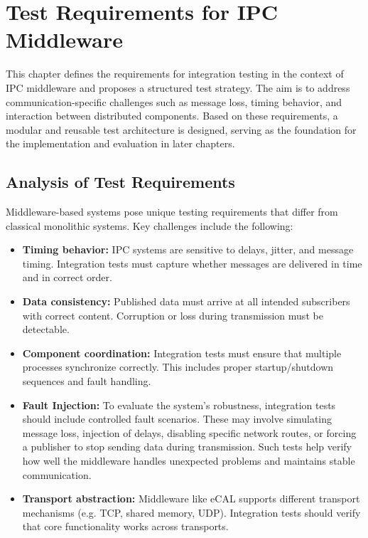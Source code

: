 \clearpage
{}

\section{Test Requirements for IPC Middleware}

This chapter defines the requirements for integration testing in the context of IPC middleware and proposes a structured test strategy. The aim is to address communication-specific challenges such as message loss, timing behavior, and interaction between distributed components. Based on these requirements, a modular and reusable test architecture is designed, serving as the foundation for the implementation and evaluation in later chapters.

\subsection{Analysis of Test Requirements}

Middleware-based systems pose unique testing requirements that differ from classical monolithic systems. Key challenges include the following:

\begin{itemize}
	\item \textbf{Timing behavior:} IPC systems are sensitive to delays, jitter, and message timing. Integration tests must capture whether messages are delivered in time and in correct order.
	
	\item \textbf{Data consistency:} Published data must arrive at all intended subscribers with correct content. Corruption or loss during transmission must be detectable.
	
	\item \textbf{Component coordination:} Integration tests must ensure that multiple processes synchronize correctly. This includes proper startup/shutdown sequences and fault handling.
	
	\item \textbf{Fault Injection:} To evaluate the system’s robustness, integration tests should include controlled fault scenarios. These may involve simulating message loss, injection of delays, disabling specific network routes, or forcing a publisher to stop sending data during transmission. Such tests help verify how well the middleware handles unexpected problems and maintains stable communication.
	
	\item \textbf{Transport abstraction:} Middleware like eCAL supports different transport mechanisms (e.g. TCP, shared memory, UDP). Integration tests should verify that core functionality works across transports.
\end{itemize}


